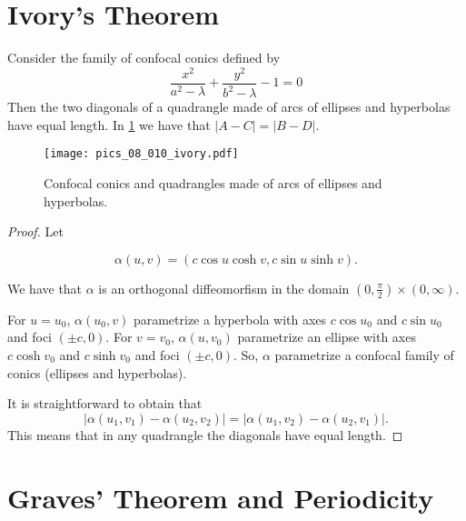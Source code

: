 \section{Ivory's Theorem}

\begin{theorem}\label{prop:ivory}
    Consider the family of confocal conics defined by
    \[\frac{x^2}{a^2-\lambda}+\frac{y^2}{b^2-\lambda}-1=0\]
    Then the two diagonals of a  quadrangle  made of arcs of ellipses and hyperbolas have equal length. In \cref{fig:ivory} we have that $|A-C|=|B-D|.$
\end{theorem}

\begin{figure}
\begin{center}
\texttt{[image: pics\_08\_010\_ivory.pdf]}
\caption{ Confocal conics and quadrangles made of arcs of ellipses and hyperbolas.}
\label{fig:ivory}
\end{center}
\end{figure}

\begin{proof} Let 

\[\alpha(u,v)=(c\cos u\cosh v, c\sin u\sinh v).\]

We have that $\alpha$ is an orthogonal  diffeomorfism in the domain $(0,\frac{\pi}{2})\times (0,\infty)$.

For $u=u_0$, $\alpha(u_0,v)$ parametrize a  hyperbola with axes $c\cos u_0$ and $ c\sin u_0$ and foci $(\pm c,0)$.
For $v=v_0$, $\alpha(u ,v_0)$ parametrize an ellipse with axes $c\cosh{ v_0}$ and $c\sinh{ v_0}$ and foci $(\pm c,0)$. So, $\alpha$ parametrize a confocal family of conics (ellipses and hyperbolas).

It is straightforward to obtain that
\[ 
|\alpha(u_1,v_1)-\alpha(u_2,v_2)|=|\alpha(u_1,v_2)-\alpha(u_2,v_1)|.\]
This means that in any quadrangle the diagonals have equal length.
\end{proof}



\section{Graves' Theorem and Periodicity}

